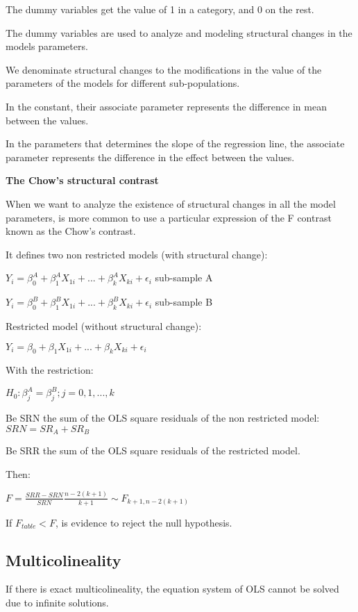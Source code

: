 \documentclass[10pt,landscape]{article}
\begin{document}
\begin{multicols}{3}
The dummy variables get the value of 1 in a category, and 0 on the rest.

The dummy variables are used to analyze and modeling structural changes in the models parameters.

We denominate structural changes to the modifications in the value of the parameters of the models for different sub-populations.

In the constant, their associate parameter represents the difference in mean between the values.

In the parameters that determines the slope of the regression line, the associate parameter represents the difference in the effect between the values.

\textbf{The Chow's structural contrast}

When we want to analyze the existence of structural changes in all the model parameters, is more common to use a particular expression of the F contrast known as the Chow's contrast.

It defines two non restricted models (with structural change):

$Y_i = \beta_0^A + \beta_1^A X_{1i} + ... + \beta_k^A X_{ki} + \epsilon_i$ sub-sample A

$Y_i = \beta_0^B + \beta_1^B X_{1i} + ... + \beta_k^B X_{ki} + \epsilon_i$ sub-sample B

Restricted model (without structural change):

$Y_i = \beta_0 + \beta_1 X_{1i} + ... + \beta_k X_{ki} + \epsilon_i$

With the restriction:

$H_0: \beta_j^A = \beta_j^B; j=0,1,...,k$

Be SRN the sum of the OLS square residuals of the non restricted model: $SRN = SR_A + SR_B$

Be SRR the sum of the OLS square residuals of the restricted model.

Then:

$F = \frac{SRR - SRN}{SRN} \frac{n-2(k+1)}{k+1} \sim F_{k+1,n-2(k+1)}$

If $F_{table} < F$, is evidence to reject the null hypothesis.

\subsection*{Multicolineality}

If there is exact multicolineality, the equation system of OLS cannot be solved due to infinite solutions.


\end{multicols}
\end{document}
